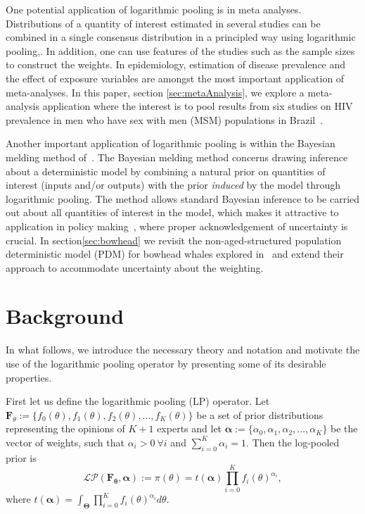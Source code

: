 \documentclass[a4paper, notitlepage, 10pt]{article}
\begin{document}
One potential application of logarithmic pooling is in meta analyses.
Distributions of a quantity of interest estimated in several studies can be combined in a single consensus distribution in a principled way using logarithmic pooling,.
In addition, one can use features of the studies such as the sample sizes to construct the weights.
In epidemiology, estimation of disease prevalence and the effect of exposure variables are amongst the most important application of meta-analyses.
In this paper, section \ref{sec:metaAnalysis}, we explore a meta-analysis application where the interest is to pool results from six studies on HIV prevalence  in men who have sex with men (MSM) populations in Brazil~\citep{malta2010hiv}.

Another important application of logarithmic pooling is within the Bayesian melding method of~\cite{poole2000}. 
The Bayesian melding method concerns drawing inference about a deterministic model by combining a natural prior on quantities of interest (inputs and/or outputs) with the prior \textit{induced} by the model through logarithmic pooling.
The method allows standard Bayesian inference to be carried out about all quantities of interest in the model, which makes it attractive to application in policy making~\citep{alkema2008}, where proper acknowledgement of uncertainty is crucial.
In section\ref{sec:bowhead} we revisit the non-aged-structured population deterministic model (PDM) for bowhead whales explored in~\cite{poole2000} and extend their approach to accommodate uncertainty about the weighting.

\section{Background}
\label{sec:background}

In what follows, we introduce the necessary theory and notation and motivate the use of the logarithmic pooling operator by presenting some of its desirable properties.

First let us define the logarithmic pooling (LP) operator.
Let $\mathbf{F}_{\theta} := \{f_0(\theta), f_1(\theta), f_2(\theta), \ldots, f_K(\theta)\}$ be a set of prior distributions representing the opinions of $K+1$ experts and let $\boldsymbol\alpha :=\{\alpha_0, \alpha_1, \alpha_2, \ldots, \alpha_K \}$ be the vector of weights, such that $\alpha_i > 0\: \forall i$ and $\sum_{i=0}^K \alpha_i = 1$.
Then the log-pooled prior is
\begin{equation}
\label{eq:logpool}
 \mathcal{LP}(\mathbf{F_\theta}, \boldsymbol\alpha) := \pi(\theta) = t(\boldsymbol\alpha) \prod_{i=0}^K f_i(\theta)^{\alpha_i},
\end{equation}
where $t(\boldsymbol\alpha) = \int_{\boldsymbol\Theta}\prod_{i=0}^K f_i(\theta)^{\alpha_i}d\theta$.
\end{document}
